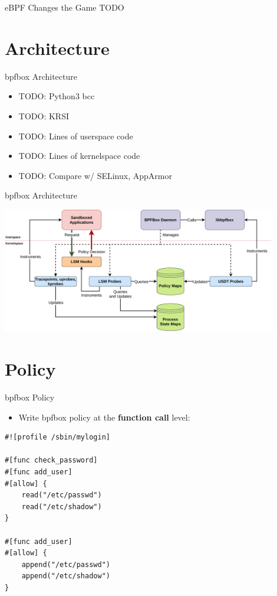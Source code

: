 \documentclass[12pt, dvipsnames]{beamer}
\begin{document}

\begin{frame}[t]{eBPF Changes the Game}
TODO
\end{frame}

\section{Architecture}

\begin{frame}[t]{bpfbox Architecture}
\begin{itemize}
    \item TODO: Python3 bcc
    \item TODO: KRSI
    \item TODO: Lines of userspace code
    \item TODO: Lines of kernelspace code
    \item TODO: Compare w/ SELinux, AppArmor
\end{itemize}
\end{frame}

\begin{frame}[t]{bpfbox Architecture}
\vfill
\begin{center}
    \color{black}
    \includegraphics[width=0.9\textwidth]{figs/bpfbox-overview.pdf}
\end{center}
\vfill
\end{frame}

\section{Policy}

\begin{frame}[t, fragile]{bpfbox Policy}
\begin{itemize}
    \item Write bpfbox policy at the \textbf{function call} level:
\end{itemize}
\begin{lstlisting}[language=bpfbox]
#![profile /sbin/mylogin]

#[func check_password]
#[func add_user]
#[allow] {
    read("/etc/passwd")
    read("/etc/shadow")
}

#[func add_user]
#[allow] {
    append("/etc/passwd")
    append("/etc/shadow")
}
\end{lstlisting}
\end{frame}
\end{document}
